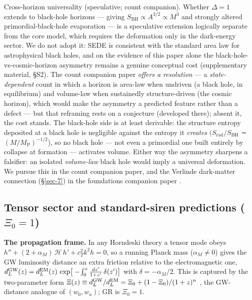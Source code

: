 \documentclass[preprint,12pt]{elsarticle}
\begin{document}
Cross-horizon universality (speculative; count companion). Whether
\(\Delta  = 1\) extends to black-hole horizons --- giving
\(S_\mathrm{BH} \propto  A^{3/2} \propto  M^{3}\) and strongly altered
primordial-black-hole evaporation --- is a speculative extension
logically separate from the core model, which requires the deformation
only in the dark-energy sector. We do not adopt it: SEDE is consistent
with the standard area law for astrophysical black holes, and on the
evidence of this paper alone the black-hole-vs-cosmic-horizon asymmetry
remains a genuine conceptual cost (supplementary material, §S2). The
count companion paper \citep{Pandev:2026count} \emph{offers a
resolution} --- a \emph{state-dependent} count in which a horizon is
area-law when undriven (a black hole, in equilibrium) and volume-law
when sustainedly structure-driven (the cosmic horizon), which would make
the asymmetry a predicted feature rather than a defect --- but that
reframing rests on a conjecture (developed there); absent it, the cost
stands. The black-hole side is at least derivable: the structure entropy
deposited at a black hole is negligible against the entropy it
\emph{creates} \((S_{\mathrm{rad}}/S_\mathrm{BH}\) ∼
\((M/M_{\mathrm{P}})^{-1/2}\)), so no black hole --- not even a
primordial one built entirely by collapse at formation --- activates
volume. Either way the asymmetry sharpens a falsifier: an isolated
\emph{volume-law} black hole would imply a universal deformation. We
pursue this in the count companion paper, and the Verlinde dark-matter
connection (§\ref{sec-7}) in the foundations companion paper
\citep{Pandev:2026foundations}.

\subsection{\texorpdfstring{Tensor sector and standard-siren predictions
(\(\Xi_0 = 1\))}{Tensor sector and standard-siren predictions (\textbackslash Xi\_0 = 1)}}\label{tensor-sector-and-standard-siren-predictions-xi_0-1}

\textbf{The propagation frame.} In any Horndeski theory a tensor mode
obeys \(h'' + (2 + \alpha_M)\,\mathcal{H}\,h' + c_T^2 k^2 h = 0\), so a
running Planck mass (\(\alpha_M \neq 0\)) gives the GW luminosity
distance an extra friction relative to the electromagnetic one,
\(d_L^{\rm GW}(z) = d_L^{\rm EM}(z)\,\exp\!\big[-\!\int_0^z \tfrac{dz'}{1+z'}\,\delta(z')\big]\)
with \(\delta = -\alpha_M/2\). This is captured by the two-parameter
form
\(\Xi(z) \equiv d_L^{\rm GW}/d_L^{\rm EM} = \Xi_0 + (1-\Xi_0)/(1+z)^n\)
\citep{Belgacem:2019lisa}, the GW-distance analogue of \((w_0,w_a)\); GR
is \(\Xi_0 = 1\).
\end{document}
